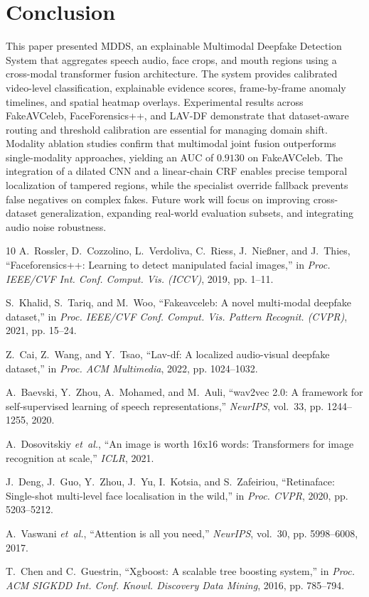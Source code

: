 \documentclass[journal,10pt,onecolumn,draftclsnofoot]{IEEEtran}
\begin{document}
\section{Conclusion}
This paper presented MDDS, an explainable Multimodal Deepfake Detection System that aggregates speech audio, face crops, and mouth regions using a cross-modal transformer fusion architecture. The system provides calibrated video-level classification, explainable evidence scores, frame-by-frame anomaly timelines, and spatial heatmap overlays. Experimental results across FakeAVCeleb, FaceForensics++, and LAV-DF demonstrate that dataset-aware routing and threshold calibration are essential for managing domain shift. Modality ablation studies confirm that multimodal joint fusion outperforms single-modality approaches, yielding an AUC of $0.9130$ on FakeAVCeleb. The integration of a dilated CNN and a linear-chain CRF enables precise temporal localization of tampered regions, while the specialist override fallback prevents false negatives on complex fakes. Future work will focus on improving cross-dataset generalization, expanding real-world evaluation subsets, and integrating audio noise robustness.


\begin{thebibliography}{10}
A.~Rossler, D.~Cozzolino, L.~Verdoliva, C.~Riess, J.~Nie{\ss}ner, and J.~Thies,
  ``Faceforensics++: Learning to detect manipulated facial images,'' in
  \emph{Proc. IEEE/CVF Int. Conf. Comput. Vis. (ICCV)}, 2019, pp. 1--11.

S.~Khalid, S.~Tariq, and M.~Woo, ``Fakeavceleb: A novel multi-modal deepfake
  dataset,'' in \emph{Proc. IEEE/CVF Conf. Comput. Vis. Pattern Recognit. (CVPR)},
  2021, pp. 15--24.

Z.~Cai, Z.~Wang, and Y.~Tsao, ``Lav-df: A localized audio-visual deepfake
  dataset,'' in \emph{Proc. ACM Multimedia}, 2022, pp. 1024--1032.

A.~Baevski, Y.~Zhou, A.~Mohamed, and M.~Auli, ``wav2vec 2.0: A framework for
  self-supervised learning of speech representations,'' \emph{NeurIPS},
  vol.~33, pp. 1244--1255, 2020.

A.~Dosovitskiy \emph{et~al.}, ``An image is worth 16x16 words: Transformers for
  image recognition at scale,'' \emph{ICLR}, 2021.

J.~Deng, J.~Guo, Y.~Zhou, J.~Yu, I.~Kotsia, and S.~Zafeiriou, ``Retinaface:
  Single-shot multi-level face localisation in the wild,'' in \emph{Proc. CVPR},
  2020, pp. 5203--5212.

A.~Vaswani \emph{et~al.}, ``Attention is all you need,'' \emph{NeurIPS},
  vol.~30, pp. 5998--6008, 2017.

T.~Chen and C.~Guestrin, ``Xgboost: A scalable tree boosting system,'' in
  \emph{Proc. ACM SIGKDD Int. Conf. Knowl. Discovery Data Mining}, 2016, pp.
  785--794.
\end{thebibliography}
\end{document}
